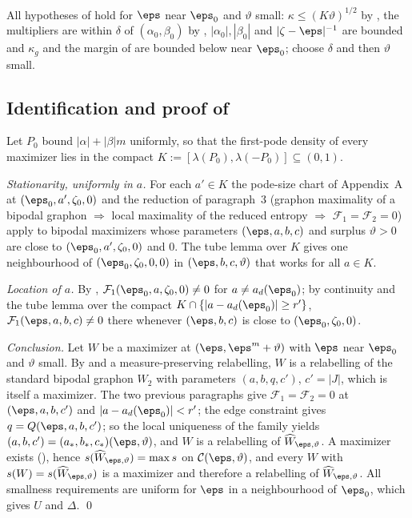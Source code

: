 All hypotheses of  hold for $\eps$ near $\eps_0$ and $\vartheta$ small:
$\kappa\le(K\vartheta)^{1/2}$ by , the multipliers are within $\delta$
of $(\alpha_0,\beta_0)$ by , $|\alpha_0|,|\beta_0|$ and
$|\zeta-\eps|^{-1}$ are bounded and $\kappa_g$ and the margin of  are bounded
below near $\eps_0$; choose $\delta$ and then $\vartheta$ small.

\subsection{Identification and proof of \texorpdfstring{}{the theorem}}
\label{kb:sec:ident}

Let $P_0$ bound $|\alpha|+|\beta|m$ uniformly, so that the first-pode density of every maximizer
lies in the compact $K:=[\lambda(P_0),\lambda(-P_0)]\subseteq(0,1)$.

\emph{Stationarity, uniformly in $a$.}  For each $a'\in K$ the pode-size chart of Appendix~A
at $(\eps_0,a',\zeta_0,0)$ and the reduction of paragraph~3 (graphon maximality of a bipodal
graphon $\Rightarrow$ local maximality of the reduced entropy $\Rightarrow$
$\mathcal F_1=\mathcal F_2=0$) apply to bipodal maximizers whose parameters $(\eps,a,b,c)$ and
surplus $\vartheta>0$ are close to $(\eps_0,a',\zeta_0,0)$ and $0$.  The tube lemma over $K$ gives
one neighbourhood of $(\eps_0,\zeta_0,0,0)$ in $(\eps,b,c,\vartheta)$ that works for all $a\in K$.

\emph{Location of $a$.}  By , $\mathcal F_1(\eps_0,a,\zeta_0,0)\ne0$ for
$a\ne a_d(\eps_0)$; by continuity and the tube lemma over the compact
$K\cap\{|a-a_d(\eps_0)|\ge r'\}$, $\mathcal F_1(\eps,a,b,c)\ne0$ there whenever $(\eps,b,c)$ is
close to $(\eps_0,\zeta_0,0)$.

\emph{Conclusion.}  Let $W$ be a maximizer at $(\eps,\eps^m+\vartheta)$ with $\eps$ near $\eps_0$
and $\vartheta$ small.  By  and a measure-preserving relabelling, $W$ is a
relabelling of the standard bipodal graphon $W_2$ with parameters $(a,b,q,c')$, $c'=|J|$, which is
itself a maximizer.  The two previous paragraphs give $\mathcal F_1=\mathcal F_2=0$ at
$(\eps,a,b,c')$ and $|a-a_d(\eps_0)|<r'$; the edge constraint gives $q=Q(\eps,a,b,c')$; so the
local uniqueness of the family yields $(a,b,c')=(a_*,b_*,c_*)(\eps,\vartheta)$, and $W$ is a
relabelling of $\widehat W_{\eps,\vartheta}$.  A maximizer exists (), hence
$s(\widehat W_{\eps,\vartheta})=\max s$ on $\mathcal C(\eps,\vartheta)$, and every $W$ with
$s(W)=s(\widehat W_{\eps,\vartheta})$ is a maximizer and therefore a relabelling of
$\widehat W_{\eps,\vartheta}$.  All smallness requirements are uniform for $\eps$ in a
neighbourhood of $\eps_0$, which gives $U$ and $\Delta$. \qed

